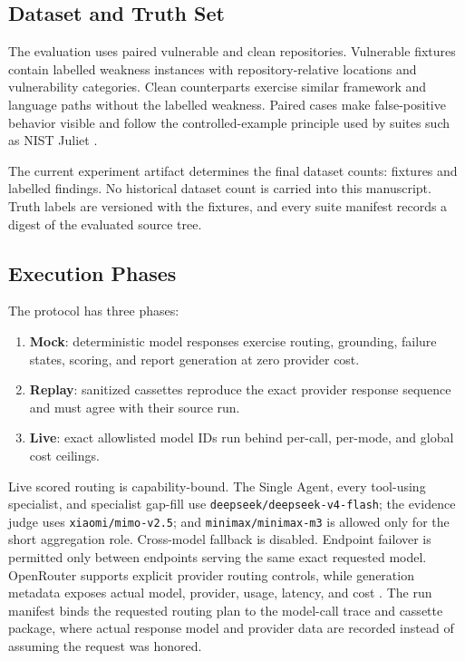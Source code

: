 \documentclass[sigconf,nonacm]{acmart}
\newcommand{\mode}[1]{\nolinkurl{#1}}
\begin{document}
\subsection{Dataset and Truth Set}
The evaluation uses paired vulnerable and clean repositories. Vulnerable fixtures contain labelled weakness instances with repository-relative locations and vulnerability categories. Clean counterparts exercise similar framework and language paths without the labelled weakness. Paired cases make false-positive behavior visible and follow the controlled-example principle used by suites such as NIST Juliet \cite{boland2012juliet}.

The current experiment artifact determines the final dataset counts: \DatasetFixtureCount{} fixtures and \DatasetTruthCount{} labelled findings. No historical dataset count is carried into this manuscript. Truth labels are versioned with the fixtures, and every suite manifest records a digest of the evaluated source tree.

\subsection{Execution Phases}
The protocol has three phases:

\begin{enumerate}[leftmargin=*]
  \item \textbf{Mock}: deterministic model responses exercise routing, grounding, failure states, scoring, and report generation at zero provider cost.
  \item \textbf{Replay}: sanitized cassettes reproduce the exact provider response sequence and must agree with their source run.
  \item \textbf{Live}: exact allowlisted model IDs run behind per-call, per-mode, and global cost ceilings.
\end{enumerate}

Live scored routing is capability-bound. The Single Agent, every tool-using
specialist, and specialist gap-fill use
\mode{deepseek/deepseek-v4-flash}; the evidence judge uses
\mode{xiaomi/mimo-v2.5}; and \mode{minimax/minimax-m3} is allowed only for the
short aggregation role. Cross-model fallback is disabled. Endpoint failover is
permitted only between endpoints serving the same exact requested model.
OpenRouter supports explicit provider routing controls, while generation
metadata exposes actual model, provider, usage, latency, and cost
\cite{openrouterrouting,openroutergeneration}. The run manifest binds the
requested routing plan to the model-call trace and cassette package, where
actual response model and provider data are recorded instead of assuming the
request was honored.
\end{document}
